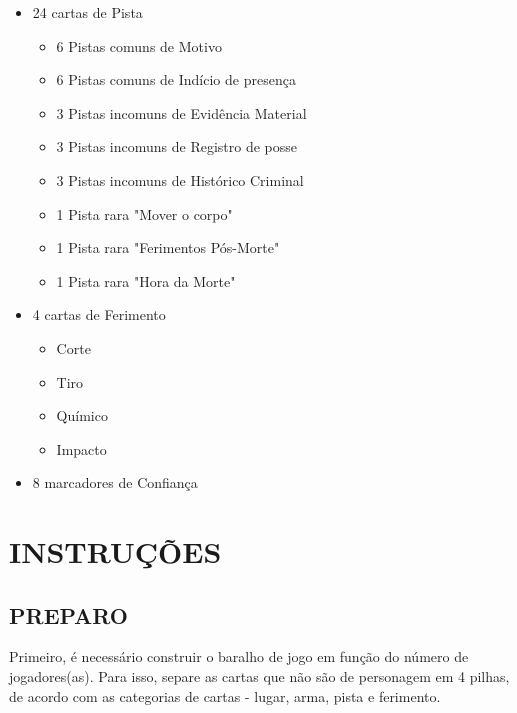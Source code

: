 \documentclass[a4paper, 11pt]{article}
\begin{document}
\begin{itemize}
\begin{itemize}
		\end{itemize}

	\item 24 cartas de Pista
		\begin{itemize}

		\item 6 Pistas comuns de Motivo
		\item 6 Pistas comuns de Indício de presença
		\item 3 Pistas incomuns de Evidência Material
		\item 3 Pistas incomuns de Registro de posse
		\item 3 Pistas incomuns de Histórico Criminal
		\item 1 Pista rara "Mover o corpo"
		\item 1 Pista rara "Ferimentos Pós-Morte"
		\item 1 Pista rara "Hora da Morte"

		\end{itemize}

	\item 4 cartas de Ferimento
		\begin{itemize}

		\item Corte
		\item Tiro
		\item Químico
		\item Impacto

		\end{itemize}

	\item 8 marcadores de Confiança

	\end{itemize}

\section*{INSTRUÇÕES}

\vspace{5mm}


\subsection*{PREPARO}

	Primeiro, é necessário construir o baralho de jogo em função do número de jogadores(as). Para isso, separe as cartas que não são de personagem em 4 pilhas, de acordo com as categorias de cartas - lugar, arma, pista e ferimento. 
\end{document}
